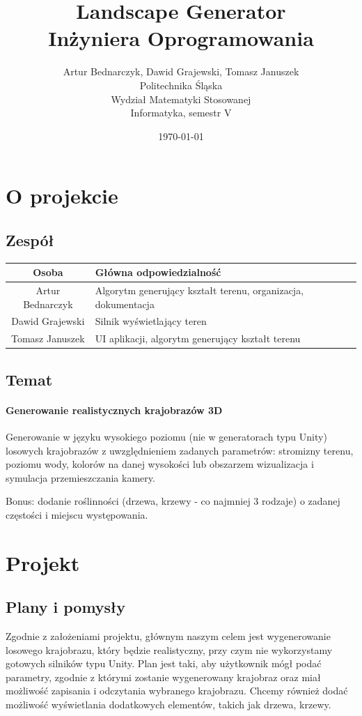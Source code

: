 \documentclass[12pt,a4paper]{article}
\title{Landscape Generator\\Inżyniera Oprogramowania}
\author{Artur Bednarczyk, Dawid Grajewski, Tomasz Januszek\\Politechnika Śląska\\Wydział Matematyki Stosowanej\\Informatyka, semestr V}
\date{\today}
\begin{document}
\maketitle
\newpage
\tableofcontents
\newpage
\section{O projekcie}
\subsection{Zespół}
\begin{tabular}{c|l}
Osoba & Główna odpowiedzialność \\
\hline
Artur Bednarczyk & Algorytm generujący kształt terenu, organizacja, dokumentacja \\
Dawid Grajewski & Silnik wyświetlający teren \\
Tomasz Januszek & UI aplikacji, algorytm generujący kształt terenu
\end{tabular}
\subsection{Temat}
\paragraph{Generowanie realistycznych krajobrazów 3D}
Generowanie w języku wysokiego poziomu (nie w generatorach typu Unity) losowych krajobrazów z uwzględnieniem zadanych parametrów: stromizny terenu, poziomu wody, kolorów na danej wysokości lub obszarzem wizualizacja i symulacja przemieszczania kamery.

Bonus: dodanie roślinności (drzewa, krzewy - co najmniej 3 rodzaje) o zadanej częstości i miejscu występowania.

\section{Projekt}
\subsection{Plany i pomysły}
Zgodnie z założeniami projektu, głównym naszym celem jest wygenerowanie losowego krajobrazu, który będzie realistyczny, przy czym nie wykorzystamy gotowych silników typu Unity. Plan jest taki, aby użytkownik mógł podać parametry, zgodnie z którymi zostanie wygenerowany krajobraz oraz miał możliwość zapisania i odczytania wybranego krajobrazu. Chcemy również dodać możliwość wyświetlania dodatkowych elementów, takich jak drzewa, krzewy.
\newpage
\end{document}
